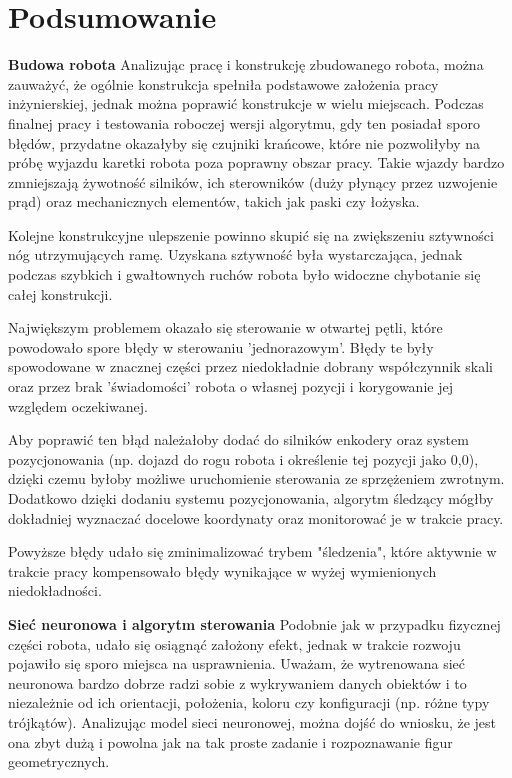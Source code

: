 \section{Podsumowanie}
\textbf{Budowa robota} \newline
Analizując pracę i konstrukcję zbudowanego robota, można zauważyć, że ogólnie konstrukcja spełniła podstawowe założenia 
pracy inżynierskiej, jednak można poprawić konstrukcje w wielu miejscach. 
Podczas finalnej pracy i testowania roboczej wersji algorytmu, gdy ten posiadał sporo błędów, przydatne okazałyby się czujniki krańcowe, które nie pozwoliłyby 
na próbę wyjazdu karetki robota poza poprawny obszar pracy. Takie wjazdy bardzo zmniejszają żywotność silników, ich sterowników (duży płynący przez uzwojenie prąd) oraz 
mechanicznych elementów, takich jak paski czy łożyska. 

Kolejne konstrukcyjne ulepszenie powinno skupić się na zwiększeniu sztywności 
nóg utrzymujących ramę. Uzyskana sztywność była wystarczająca, jednak podczas szybkich i gwałtownych ruchów robota było widoczne chybotanie się 
całej konstrukcji. 


Największym problemem okazało się sterowanie w otwartej pętli, które powodowało spore błędy w sterowaniu 'jednorazowym'. 
Błędy te były spowodowane w znacznej części przez niedokładnie dobrany współczynnik skali oraz przez brak 'świadomości' robota
o własnej pozycji i korygowanie jej względem oczekiwanej. 


Aby poprawić ten błąd należałoby dodać do silników enkodery oraz system pozycjonowania (np. dojazd do rogu robota i określenie tej pozycji jako 0,0),
dzięki czemu byłoby możliwe uruchomienie sterowania ze sprzężeniem zwrotnym.
Dodatkowo dzięki dodaniu systemu pozycjonowania, algorytm śledzący mógłby dokładniej wyznaczać docelowe koordynaty oraz 
monitorować je w trakcie pracy. 

Powyższe błędy udało się zminimalizować trybem "śledzenia", które aktywnie w trakcie pracy kompensowało 
błędy wynikające w wyżej wymienionych niedokładności.

\textbf{Sieć neuronowa i algorytm sterowania} \newline
Podobnie jak w przypadku fizycznej części robota, udało się osiągnąć założony efekt, jednak w trakcie rozwoju pojawiło się sporo 
miejsca na usprawnienia. Uważam, że wytrenowana sieć neuronowa bardzo dobrze radzi sobie z wykrywaniem danych obiektów i to niezależnie od ich 
orientacji, położenia, koloru czy konfiguracji (np. różne typy trójkątów). Analizując model sieci neuronowej, można dojść do wniosku,
że jest ona zbyt dużą i powolna jak na tak proste zadanie i rozpoznawanie figur geometrycznych. 


